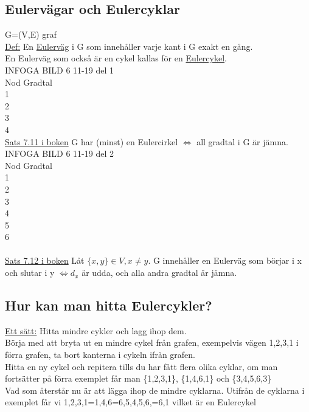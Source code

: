 \documentclass{article}
\begin{document}
    \subsection{Eulervägar och Eulercyklar}
    G=(V,E) graf\\
    \underline{Def:} En \underline{Eulerväg} i G som innehåller varje kant i G exakt en gång.\\
    \indent En Eulerväg som också är en cykel kallas för en \underline{Eulercykel}.\\
    INFOGA BILD 6 11-19 del 1\\
    Nod Gradtal\\
        1 \indent {}\\
        2 \indent {}\\
        3 \indent {}\\
        4 \indent {}\\
    \underline{Sats 7.11 i boken} G har (minst) en Eulercirkel $\Leftrightarrow$ all gradtal i G är jämna.
    INFOGA BILD 6 11-19 del 2\\
    Nod Gradtal\\
        1 \indent {}\\
        2 \indent {}\\
        3 \indent {}\\
        4 \indent {}\\
        5 \indent {}\\
        6 \indent {}\\
    \\
    \underline{Sats 7.12 i boken} Låt $\{x,y\}\in V, x\neq y$. G innehåller en Eulerväg som börjar i x och slutar i y $\Leftrightarrow  d_{x}$ är udda, och alla andra gradtal är jämna.
    \subsection{Hur kan man hitta Eulercykler?}
    \underline{Ett sätt:} Hitta mindre cykler och lagg ihop dem.\\
    Börja med att bryta ut en mindre cykel från grafen, exempelvis vägen 1,2,3,1 i förra grafen, ta bort kanterna i cykeln ifrån grafen.\\
    Hitta en ny cykel och repitera tills du har fått flera olika cyklar, om man fortsätter på förra exemplet får man \{1,2,3,1\}, \{1,4,6,1\} och \{3,4,5,6,3\}\\
    Vad som återstår nu är att lägga ihop de mindre cyklarna. Utifrån de cyklarna i exemplet får vi 1,2,3,1=1,4,6=6,5,4,5,6,=6,1 vilket är en Eulercykel
\end{document}
